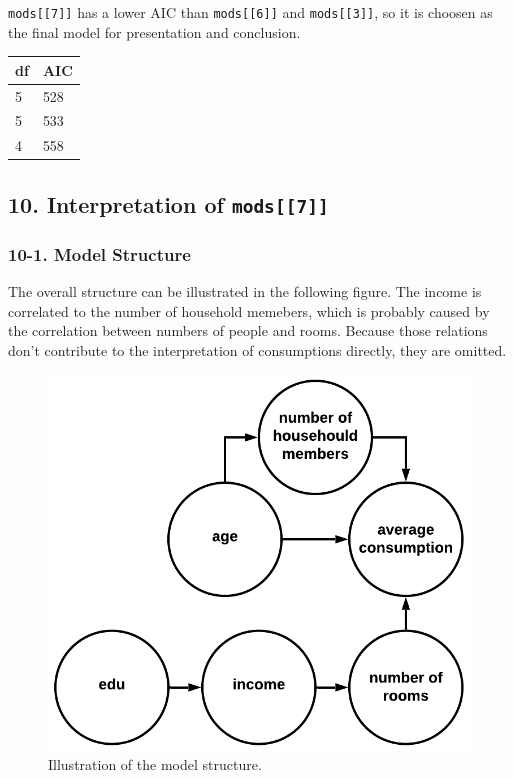 \documentclass[a4paper]{article}
\begin{document}
\texttt{mods{[}{[}7{]}{]}} has a lower AIC than
\texttt{mods{[}{[}6{]}{]}} and \texttt{mods{[}{[}3{]}{]}}, so it is
choosen as the final model for presentation and conclusion.

\begin{table}[H]
\centering
\begin{tabular}{ll}
\toprule
df & AIC\\
\midrule
5 & 528\\
5 & 533\\
4 & 558\\
\bottomrule
\end{tabular}
\end{table}

\hypertarget{interpretation-of-mods7}{%
\subsection{\texorpdfstring{10. Interpretation of
\texttt{mods{[}{[}7{]}{]}}}{10. Interpretation of mods{[}{[}7{]}{]}}}\label{interpretation-of-mods7}}

\hypertarget{model-structure}{%
\subsubsection{10-1. Model Structure}\label{model-structure}}

The overall structure can be illustrated in the following figure. The
income is correlated to the number of household memebers, which is
probably caused by the correlation between numbers of people and rooms.
Because those relations don't contribute to the interpretation of
consumptions directly, they are omitted.

\begin{figure}
\centering
\includegraphics{./1.png}
\caption{Illustration of the model structure.}
\end{figure}
\end{document}
